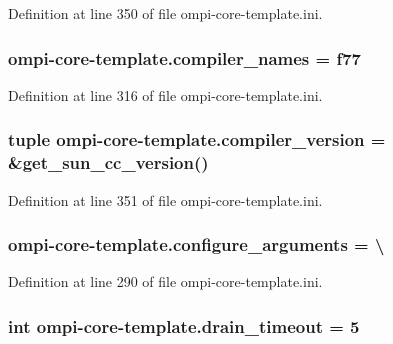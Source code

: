 Definition at line 350 of file ompi-\/core-\/template.\-ini.

\hypertarget{namespaceompi-core-template_ad9ac09e41f4ccb6262103f180cbfc0db}{
\subsubsection[{compiler\-\_\-names}]{\setlength{\rightskip}{0pt plus 5cm}ompi-\/core-\/template.\-compiler\-\_\-names = f77}}\label{namespaceompi-core-template_ad9ac09e41f4ccb6262103f180cbfc0db}


Definition at line 316 of file ompi-\/core-\/template.\-ini.

\hypertarget{namespaceompi-core-template_a7cee2f24a23de4deacdb5e9b2ac629de}{
\subsubsection[{compiler\-\_\-version}]{\setlength{\rightskip}{0pt plus 5cm}tuple ompi-\/core-\/template.\-compiler\-\_\-version = \&get\-\_\-sun\-\_\-cc\-\_\-version()}}\label{namespaceompi-core-template_a7cee2f24a23de4deacdb5e9b2ac629de}


Definition at line 351 of file ompi-\/core-\/template.\-ini.

\hypertarget{namespaceompi-core-template_aa36e733a811f66e0670e3e5359fa87c0}{
\subsubsection[{configure\-\_\-arguments}]{\setlength{\rightskip}{0pt plus 5cm}ompi-\/core-\/template.\-configure\-\_\-arguments = \textbackslash{}}}\label{namespaceompi-core-template_aa36e733a811f66e0670e3e5359fa87c0}


Definition at line 290 of file ompi-\/core-\/template.\-ini.

\hypertarget{namespaceompi-core-template_a9b0a0d844979f7c5b1aa019aa4ddf2f1}{
\subsubsection[{drain\-\_\-timeout}]{\setlength{\rightskip}{0pt plus 5cm}int ompi-\/core-\/template.\-drain\-\_\-timeout = 5}}\label{namespaceompi-core-template_a9b0a0d844979f7c5b1aa019aa4ddf2f1}


